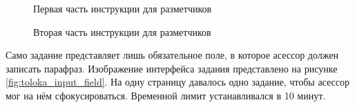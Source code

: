 \begin{figure}[ht]
  \centering
  \caption{Первая часть инструкции для разметчиков}
  \label{fig:toloka_instruction_1}
\end{figure}

\begin{figure}[ht]
  \centering
  \caption{Вторая часть инструкции для разметчиков}
  \label{fig:toloka_instruction_2}
\end{figure}

Само задание представляет лишь обязательное поле, в которое асессор должен записать парафраз.
Изображение интерфейса задания представлено на рисунке \ref{fig:toloka_input_field}.
На одну страницу давалось одно задание, чтобы асессор мог на нём сфокусироваться. Временной лимит устанавливался в 10 минут.

